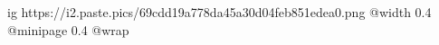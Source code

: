  
 
 
 
 

\ifcmt
  ig https://i2.paste.pics/69cdd19a778da45a30d04feb851edea0.png
  @width 0.4
  @minipage 0.4
  @wrap \parpic[r]
\fi
